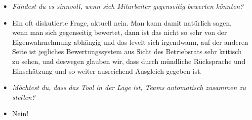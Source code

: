 \begin{itemize}
\item[] \textit{Fändest du es sinnvoll, wenn sich Mitarbeiter gegenseitig bewerten könnten?}
\item[] Ein oft diskutierte Frage, aktuell nein. Man kann damit natürlich sagen, wenn man sich gegenseitig bewertet, dann ist das nicht so sehr von der Eigenwahrnehmung abhängig und das levelt sich irgendwann, auf der anderen Seite ist jegliches Bewertungssystem aus Sicht des Betriebsrats sehr kritisch zu sehen, und deswegen glauben wir, dass durch mündliche Rücksprache und Einschätzung und so weiter ausreichend Ausgleich gegeben ist.

\item[] \textit{Möchtest du, dass das Tool in der Lage ist, Teams automatisch zusammen zu stellen?}
\item[] Nein!
\end{itemize}











